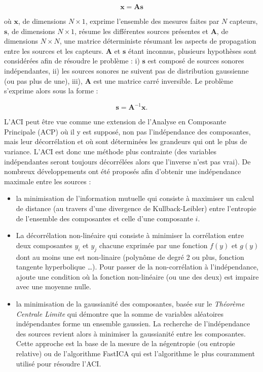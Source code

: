 \begin{equation}\label{eq:ACI2}
\mathbf{x} = \mathbf{As}
\end{equation}

où $\mathbf{x}$, de dimensions $N \times 1$, exprime l'ensemble des mesures faites par $N$ capteurs, $\mathbf{s}$, de dimensions $N \times 1$, résume les différentes sources présentes et $\mathbf{A}$, de dimensions $N \times N$, une matrice déterministe résumant les aspects de propagation entre les sources et les capteurs.
$\mathbf{A}$ et $\mathbf{s}$ étant inconnus, plusieurs hypothèses sont considérées afin de résoudre le problème : i) $\mathbf{s}$ est composé de sources sonores indépendantes, ii) les sources sonores ne suivent pas de distribution gaussienne (ou pas plus de une), iii), $\mathbf{A}$ est une matrice carré inversible. Le problème s'exprime alors sous la forme :

\begin{equation}
\mathbf{s} = \mathbf{A}^{-1}\mathbf{x}.
\end{equation}

L'ACI peut être vue comme une extension de l'Analyse en Composante Principale (ACP) où il y est supposé, non pas l'indépendance des composantes, mais leur décorrélation et où sont déterminées les grandeurs qui ont le plus de variance. L'ACI est donc une méthode plus contrainte (des variables indépendantes seront toujours décorrélées alors que l'inverse n'est pas vrai).
De nombreux développements ont été proposés afin d'obtenir une indépendance maximale entre les sources :

\begin{itemize}
\item la minimisation de l'information mutuelle \cite{hyvarinen97independentcomponent} qui consiste à maximiser un calcul de distance (au travers d'une divergence de Kullback-Leibler) entre l'entropie de l'ensemble des composantes et celle d'une composante $i$.
\item La décorrélation non-linéaire qui consiste à minimiser la corrélation entre deux composantes $y_i$ et $y_j$ chacune exprimée par une fonction $f(y)$ et $g(y)$ dont au moins une est non-linaire (polynôme de degré 2 ou plus, fonction tangente hyperbolique \dots). Pour passer de la non-corrélation à l'indépendance, \cite{jutten1991blind} ajoute une condition où la fonction non-linéaire (ou une des deux)  est impaire avec une moyenne nulle.
\item la minimisation de la \og gaussianité \fg{} des composantes, basée sur le \textit{Théorème Centrale Limite} qui démontre que la somme de variables aléatoires indépendantes forme un ensemble gaussien. La recherche de l'indépendance des sources revient alors à minimiser la \og gaussianité \fg{} entre les composantes. Cette approche est la base de la mesure de la négentropie (ou entropie relative) \cite{lee2000unifying} ou de l'algorithme FastICA \cite{hyvarinen1999fast} qui est l'algorithme le plus couramment utilisé pour résoudre l'ACI.
\end{itemize}

